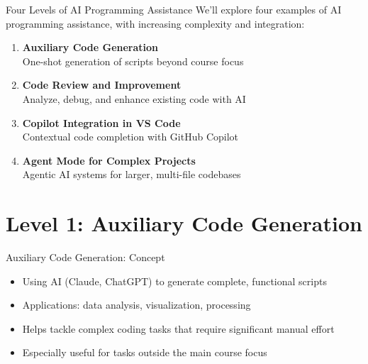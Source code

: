 \documentclass[xcolor=dvipsnames, aspectratio=169]{beamer}
\begin{document}
\begin{frame}{Four Levels of AI Programming Assistance}
  We'll explore four examples of AI programming assistance, with increasing complexity and integration:
  
  \begin{enumerate}
    \item \textbf{Auxiliary Code Generation}\\
    One-shot generation of scripts beyond course focus
    
    \item \textbf{Code Review and Improvement}\\
    Analyze, debug, and enhance existing code with AI
    
    \item \textbf{Copilot Integration in VS Code}\\
    Contextual code completion with GitHub Copilot
    
    \item \textbf{Agent Mode for Complex Projects}\\
    Agentic AI systems for larger, multi-file codebases
  \end{enumerate}
\end{frame}

\section{Level 1: Auxiliary Code Generation}

\begin{frame}{Auxiliary Code Generation: Concept}
  \begin{itemize}
    \item Using AI (Claude, ChatGPT) to generate complete, functional scripts
    \item Applications: data analysis, visualization, processing
    \item Helps tackle complex coding tasks that require significant manual effort
    \item Especially useful for tasks outside the main course focus
  \end{itemize}
\end{frame}
\end{document}
